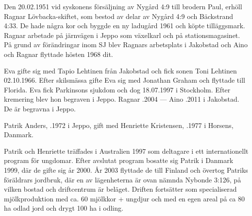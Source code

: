 Den 20.02.1951 vid syskonens försäljning av Nygård 4:9 till brodern Paul, erhöll Ragnar Lövbacka-skiftet, som bestod av delar av Nygård 4:9 och Bäckstrand 4:33. De hade några kor och byggde en ny ladugård 1961 och köpte tilläggsmark. Ragnar arbetade på järnvägen i Jeppo som växelkarl och på stationsmagasinet. På grund av förändringar inom SJ blev Ragnars arbetsplats i Jakobstad och Aino och Ragnar flyttade hösten 1968 dit.
\begin{jhchildren}
  \item {}
  \item {}
\end{jhchildren}
Eva gifte sig med Tapio Lehtinen från Jakobstad och fick sonen Toni Lehtinen 02.10.1966. Efter skilsmässa gifte Eva sig med Jonathan Graham och flyttade till Florida. Eva fick Parkinsons sjukdom och dog 18.07.1997 i Stockholm. Efter kremering blev hon begraven i Jeppo.
Ragnar .2004  ---  Aino .2011 i Jakobstad. De är begravna i Jeppo.






Patrik Anders, .1972 i Jeppo, gift med Henriette Kristensen, .1977 i Horsens, Danmark.

\begin{jhchildren}
  \item {}
  \item {}
  \item {}
  \item {}
  \item {}
\end{jhchildren}

Patrik och Henriette träffades i Australien 1997 som deltagare i ett internationellt program för ungdomar. Efter avslutat program bosatte sig Patrik i Danmark 1999, där de gifte sig år 2000. År 2003 flyttade de till Finland och övertog Patriks föräldrars jordbruk, där en av  lägenheterna är ovan nämnda Nybonde 3:126, på vilken bostad och driftcentrum är beläget. Driften fortsätter som specialiserad mjölkproduktion med ca. 60 mjölkkor + ungdjur och med en egen areal på ca 80 ha odlad jord och drygt 100 ha i odling.


